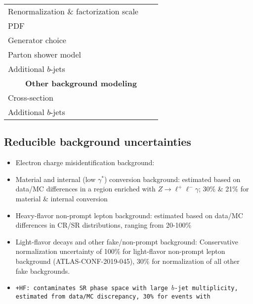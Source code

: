 \documentclass[../thesis.tex]{subfiles}
\begin{document}
\begin{table}[!htbp]
\begin{center}
\begin{tabular}{lcc}
      Renormalization \& factorization scale & & \\
      PDF & & \\
      Generator choice & & \\
      Parton shower model & & \\
      Additional $b$-jets & & \\
      \midrule
      \multicolumn{3}{c}{\textbf{Other background modeling}}  \\
      \midrule
      Cross-section & & \\
      Additional $b$-jets & & \\
      \bottomrule
    \end{tabular}
  \end{center}
\end{table}

\subsection{Reducible background uncertainties}


\begin{itemize}
\item Electron charge misidentification background: 
\item Material and internal (low $\gamma^{*}$) conversion background: estimated based on data/MC differences in a region enriched with $Z \rightarrow \ell^+\ell^-\gamma$; 30\% \& 21\% for material \& internal conversion
\item Heavy-flavor non-prompt lepton background: estimated based on data/MC differences in CR/SR distributions, ranging from 20-100\%
\item Light-flavor decays and other fake/non-prompt background: Conservative normalization uncertainty of 100\% for light-flavor non-prompt lepton background (ATLAS-CONF-2019-045), 30\% for normalization of all other fake backgrounds.
\item \tt+HF: contaminates SR phase space with large $b$-jet multiplicity, estimated from data/MC discrepancy, 30\% for \tt events with 
\end{itemize}
\end{document}

